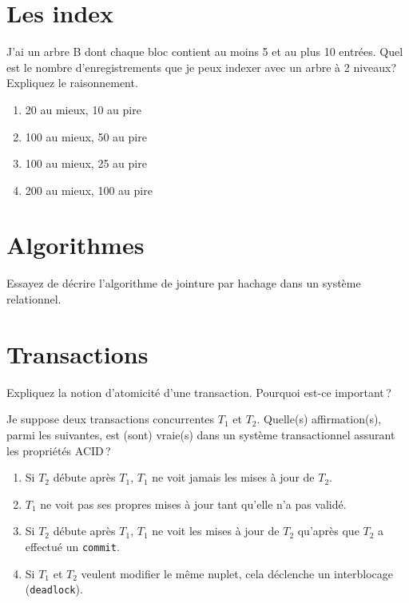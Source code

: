 \documentclass[10pt]{article}
\begin{document}
\section{Les index}

J'ai un arbre B dont chaque bloc contient au moins 5 et au plus 10 entrées.
Quel est le nombre d’enregistrements que je peux indexer avec un arbre à 2 niveaux?
Expliquez le raisonnement.

\begin{enumerate}
 \item 20 au mieux, 10 au pire
 \item 100 au mieux, 50 au pire
 \item 100 au mieux, 25 au pire
 \item 200 au mieux, 100 au pire
\end{enumerate}


\section{Algorithmes}

Essayez de décrire l'algorithme de jointure par hachage dans un système relationnel.

\section{Transactions}

Expliquez la notion d'atomicité d'une transaction. Pourquoi est-ce important\,?

\medskip

Je suppose deux transactions concurrentes  $T_1$ et  $T_2$. Quelle(s) affirmation(s), parmi les suivantes, est (sont) vraie(s) 
dans un système transactionnel assurant les propriétés ACID\,?

\begin{enumerate}
   \item  Si $T_2$  débute après $T_1$,
       $T_1$  ne voit jamais les  mises à jour de $T_2$.
   
   \item $T_1$  ne voit pas ses propres mises à jour tant qu'elle n'a pas validé.
   
  \item Si $T_2$  débute après $T_1$,
       $T_1$  ne voit les  mises à jour de $T_2$ qu'après  que $T_2$ a effectué un \texttt{commit}.

  \item Si  $T_1$  et $T_2$  veulent modifier le même nuplet,
       cela déclenche un interblocage (\texttt{deadlock}).
   
\end{enumerate}
\end{document}
